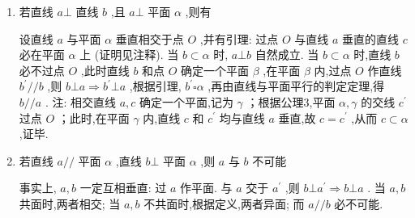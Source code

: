 \begin{enumerate}
\begin{jieda}
        对于,设直线 $l$ 与平面 $\alpha$ 相交于 $O$ 点,则平面 $\alpha$ 内过 $O$ 点的任意直线都满足要求,错误；对于,若直线 $l$ 在平面 $\alpha$ 内,则平面 $\alpha$ 内可以作无数条直线与 $l$ 平行,错误；对于,不论直线 $l$ 与平面 $\alpha$ 相交(但不垂直)、平行或在平面 $\alpha$ 内, 都能在 $\alpha$ 内找到无数条直线与直线 $l$ 垂直,例如在正方体 ${ABCD} - {A}^{\prime }{B}^{\prime }{C}^{\prime }{D}^{\prime }$ 中,取 $\alpha  =$ 平面 ${ABCD},l = A{D}^{\prime }$ (或 ${A}^{\prime }{D}^{\prime }$ 或 ${AD}$ ),则 $\alpha$ 内任意与 ${AB}$ 平行的直线均符合要求,错误; 对于,本命题的逆否命题是: 若 $l \subset  \alpha$ ,则平面 $\alpha$ 内的所有直线都与直线 $l$ 共面,这是真命题,正确. 综上,正确的个数是 1 个. 注: 对于,也可使用反证法. 另外,“平面 $\alpha$ 内有一条直线和直线 $l$ 异面”,即“平面 $\alpha$ 内存在一条直线和直线 $l$ 不共面”,特别注意:其否定并不是 “平面 $\alpha$ 内存在一条直线和直线 $l$ 共面”.
    \end{jieda}
    \item 若直线 $a \bot$ 直线 $b$ ,且 $a \bot$ 平面 $\alpha$ ,则有
    \begin{jieda}
        设直线 $a$ 与平面 $\alpha$ 垂直相交于点 $O$ ,并有引理: 过点 $O$ 与直线 $a$ 垂直的直线 $c$ 必在平面 $\alpha$ 上 (证明见注释). 当 $b \subset  \alpha$ 时, $a \bot  b$ 自然成立. 当 $b \subset  \alpha$ 时,直线 $b$ 必不过点 $O$ ,此时直线 $b$ 和点 $O$ 确定一个平面 $\beta$ ,在平面 $\beta$ 内,过点 $O$ 作直线 ${b}^{\prime }//b$ ,则 $b\bot a \Longrightarrow  {b}^{\prime }\bot a$ ,根据引理, ${b}^{\prime }\square \alpha$ ,再由直线与平面平行的判定定理,得 $b//a$ . 注: 相交直线 $a,c$ 确定一个平面,记为 $\gamma$ ；根据公理3,平面 $\alpha ,\gamma$ 的交线 ${c}^{\prime }$ 过点 $O$ ；此时,在平面 $\gamma$ 内,直线 $c$ 和 ${c}^{\prime }$ 均与直线 $a$ 垂直,故 $c = {c}^{\prime }$ ,从而 $c \subset  \alpha$ ,证毕.
    \end{jieda}
    \item 若直线 $a//$ 平面 $\alpha$ ,直线 $b\bot$ 平面 $\alpha$ ,则 $a$ 与 $b$ 不可能
    \begin{jieda}
        事实上, $a,b$ 一定互相垂直: 过 $a$ 作平面. 与 $a$ 交于 ${a}^{\prime }$ ,则 $b\bot {a}^{\prime } \Longrightarrow  b\bot a$ . 当 $a,b$ 共面时,两者相交; 当 $a,b$ 不共面时,根据定义,两者异面; 而 $a//b$ 必不可能.
    \end{jieda}
    

\end{enumerate}
